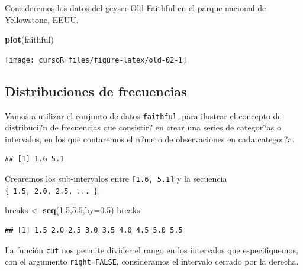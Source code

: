 \documentclass[]{book}
\newenvironment{Shaded}{\begin{snugshade}}{\end{snugshade}}
\newcommand{\KeywordTok}[1]{\textcolor[rgb]{0.13,0.29,0.53}{\textbf{#1}}}
\newcommand{\DataTypeTok}[1]{\textcolor[rgb]{0.13,0.29,0.53}{#1}}
\newcommand{\FloatTok}[1]{\textcolor[rgb]{0.00,0.00,0.81}{#1}}
\newcommand{\StringTok}[1]{\textcolor[rgb]{0.31,0.60,0.02}{#1}}
\newcommand{\OperatorTok}[1]{\textcolor[rgb]{0.81,0.36,0.00}{\textbf{#1}}}
\newcommand{\NormalTok}[1]{#1}
\begin{document}
Consideremos los datos del geyser Old Faithful en el parque nacional de
Yellowstone, EEUU.

\begin{Shaded}
\begin{Highlighting}[]
\KeywordTok{plot}\NormalTok{(faithful)}
\end{Highlighting}
\end{Shaded}

\begin{center}\texttt{[image: cursoR\_files/figure-latex/old-02-1]} \end{center}

\subsection{Distribuciones de
frecuencias}\label{distribuciones-de-frecuencias}

Vamos a utilizar el conjunto de datos \texttt{faithful}, para ilustrar
el concepto de distribuci?n de frecuencias que consistir? en crear una
series de categor?as o intervalos, en los que contaremos el n?mero de
observaciones en cada categor?a.

\begin{Shaded}
\end{Shaded}

\begin{verbatim}
## [1] 1.6 5.1
\end{verbatim}

Crearemos los sub-intervalos entre \texttt{{[}1.6,\ 5.1{]}} y la
secuencia \texttt{\{\ 1.5,\ 2.0,\ 2.5,\ ...\ \}}.

\begin{Shaded}
\begin{Highlighting}[]
\NormalTok{breaks <-}\StringTok{ }\KeywordTok{seq}\NormalTok{(}\FloatTok{1.5}\NormalTok{,}\FloatTok{5.5}\NormalTok{,}\DataTypeTok{by=}\FloatTok{0.5}\NormalTok{)}
\NormalTok{breaks}
\end{Highlighting}
\end{Shaded}

\begin{verbatim}
## [1] 1.5 2.0 2.5 3.0 3.5 4.0 4.5 5.0 5.5
\end{verbatim}

La función \texttt{cut} nos permite divider el rango en los intervalos
que especifiquemos, con el argumento \texttt{right=FALSE}, consideramos
el intervalo cerrado por la derecha.
\end{document}

